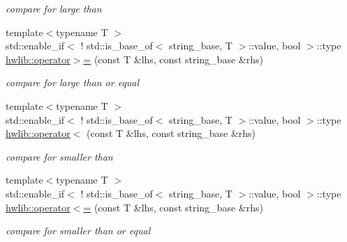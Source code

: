 \begin{DoxyCompactItemize}
\begin{DoxyCompactList}\small\item\em compare for large than \end{DoxyCompactList}\item 
\mbox{\label{namespacehwlib_a4cc49ba4eadea48695a4a8e840529c43}} 
{\footnotesize template$<$typename T $>$ }\\std\+::enable\+\_\+if$<$ ! std\+::is\+\_\+base\+\_\+of$<$ string\+\_\+base, T $>$\+::value, bool $>$\+::type \hyperlink{namespacehwlib_a4cc49ba4eadea48695a4a8e840529c43}{hwlib\+::operator$>$=} (const T \&lhs, const string\+\_\+base \&rhs)
\begin{DoxyCompactList}\small\item\em compare for large than or equal \end{DoxyCompactList}\item 
\mbox{\label{namespacehwlib_a57b60e2aaed94e65133d70811a3a6308}} 
{\footnotesize template$<$typename T $>$ }\\std\+::enable\+\_\+if$<$ ! std\+::is\+\_\+base\+\_\+of$<$ string\+\_\+base, T $>$\+::value, bool $>$\+::type \hyperlink{namespacehwlib_a57b60e2aaed94e65133d70811a3a6308}{hwlib\+::operator$<$} (const T \&lhs, const string\+\_\+base \&rhs)
\begin{DoxyCompactList}\small\item\em compare for smaller than \end{DoxyCompactList}\item 
\mbox{\label{namespacehwlib_a5b4b2bb65a42dc81a8a322fe5c559f94}} 
{\footnotesize template$<$typename T $>$ }\\std\+::enable\+\_\+if$<$ ! std\+::is\+\_\+base\+\_\+of$<$ string\+\_\+base, T $>$\+::value, bool $>$\+::type \hyperlink{namespacehwlib_a5b4b2bb65a42dc81a8a322fe5c559f94}{hwlib\+::operator$<$=} (const T \&lhs, const string\+\_\+base \&rhs)
\begin{DoxyCompactList}\small\item\em compare for smaller than or equal \end{DoxyCompactList}\end{DoxyCompactItemize}
